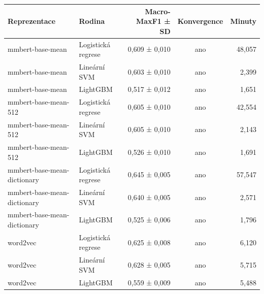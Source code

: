 \begin{tabular}{llrcr}
\toprule
Reprezentace & Rodina & Macro-MaxF1 ± SD & Konvergence & Minuty\\
\midrule
mmbert-base-mean & Logistická regrese & 0,609 ± 0,010 & ano & 48,057\\
mmbert-base-mean & Lineární SVM & 0,603 ± 0,010 & ano & 2,399\\
mmbert-base-mean & LightGBM & 0,517 ± 0,012 & ano & 1,651\\
mmbert-base-mean-512 & Logistická regrese & 0,605 ± 0,010 & ano & 42,554\\
mmbert-base-mean-512 & Lineární SVM & 0,605 ± 0,010 & ano & 2,143\\
mmbert-base-mean-512 & LightGBM & 0,526 ± 0,010 & ano & 1,691\\
mmbert-base-mean-dictionary & Logistická regrese & 0,645 ± 0,005 & ano & 57,547\\
mmbert-base-mean-dictionary & Lineární SVM & 0,640 ± 0,005 & ano & 2,571\\
mmbert-base-mean-dictionary & LightGBM & 0,525 ± 0,006 & ano & 1,796\\
word2vec & Logistická regrese & 0,625 ± 0,008 & ano & 6,120\\
word2vec & Lineární SVM & 0,628 ± 0,005 & ano & 5,715\\
word2vec & LightGBM & 0,559 ± 0,009 & ano & 5,488\\
\bottomrule
\end{tabular}
